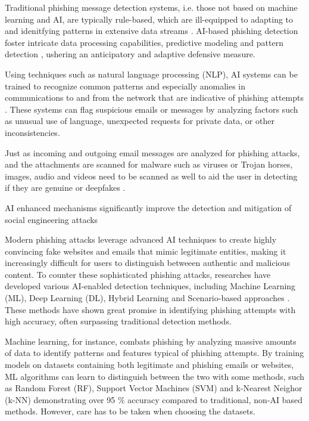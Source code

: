 Traditional phishing message detection systems, i.e. those not based on machine learning and AI, are typically rule-based, which are ill-equipped to adapting to and idenitfying patterns in extensive data streams . AI-based phishing detection foster intricate data processing capabilities, predictive modeling and pattern detection \citep{fakhouri_AI_Driven_Solutions_SE_Attacks_2024}, ushering an anticipatory and adaptive defensive measure.

Using techniques such as natural language processing (NLP), AI systems can be trained to recognize common patterns and especially anomalies in communications to and from the network that are indicative of phishing attempts \citep{basit_Comprehensive_Survey_AI_Phishing_Detection_2021}. These systems can flag suspicious emails or messages by analyzing factors such as unusual use of language, unexpected requests for private data, or other inconsistencies.

Just as incoming and outgoing email messages are analyzed for phishing attacks, and the attachments are scanned for malware such as viruses or Trojan horses, images, audio and videos need to be scanned as well to aid the user in detecting if they are genuine or deepfakes \citep{mirskyTheCreationAndDetectionOfDeepfakes2021}.

AI enhanced mechanisms significantly improve the detection and mitigation of social engineering attacks \citep{fakhouriAIDrivenSolutionsForSocialEngineeringAttacks2024}

Modern phishing attacks leverage advanced AI techniques to create highly convincing fake websites and emails that mimic legitimate entities, making it increasingly difficult for users to distinguish betweeen authentic and malicious content. To counter these sophisticated phishing attacks, researches have developed various AI-enabled detection techniques, including Machine Learning (ML), Deep Learning (DL), Hybrid Learning and Scenario-based approaches \citep{basitComprehensiveSurveyAIenabledPhishingAttacks2021}. These methods have shown great promise in identifying phishing attempts with high accuracy, often surpassing traditional detection methods.


Machine learning, for instance, combats phishing by analyzing massive amounts of data to identify patterns and features typical of phishing attempts. By training models on datasets containing both legitimate and phishing emails or websites, ML algorithms can learn to distinguish between the two with some methods, such as Random Forest (RF), Support Vector Machines (SVM) and k-Nearest Neighor (k-NN) demonstrating over 95 \% accuracy compared to traditional, non-AI based methods. However, care has to be taken when choosing the datasets.

